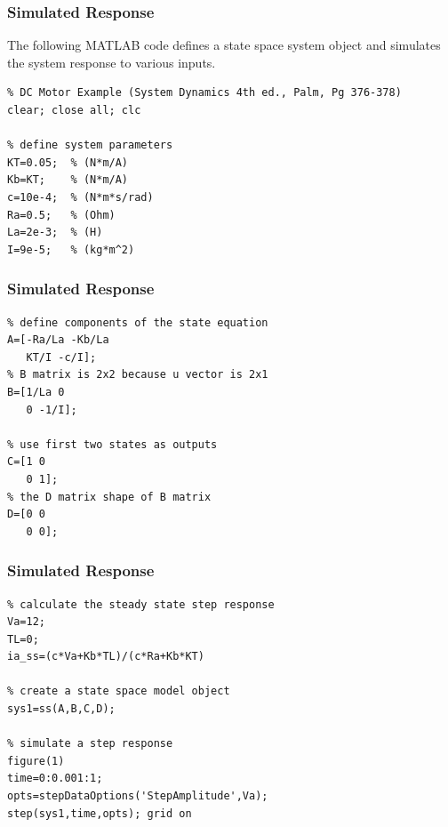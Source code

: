 \documentclass[fleqn]{beamer}                  %
\newcommand{\sectiontitleV}{Simulated Response}
\begin{document}
	\begin{frame}[containsverbatim,label=sectionV] \small
		\frametitle{\sectiontitleV}

		The following MATLAB code defines a state space system object and simulates the system response to various inputs.
		
		\begin{lstlisting}
% DC Motor Example (System Dynamics 4th ed., Palm, Pg 376-378)  
clear; close all; clc

% define system parameters
KT=0.05;  % (N*m/A)
Kb=KT;    % (N*m/A)
c=10e-4;  % (N*m*s/rad)   
Ra=0.5;   % (Ohm)
La=2e-3;  % (H)
I=9e-5;   % (kg*m^2)
		\end{lstlisting}
\end{frame}	

	\begin{frame}[containsverbatim,label=sectionV] \small
		\frametitle{\sectiontitleV}
		\begin{lstlisting}
% define components of the state equation
A=[-Ra/La -Kb/La
   KT/I -c/I];
% B matrix is 2x2 because u vector is 2x1
B=[1/La 0 
   0 -1/I];

% use first two states as outputs
C=[1 0
   0 1];
% the D matrix shape of B matrix 
D=[0 0
   0 0];
		\end{lstlisting}
	\end{frame}

	\begin{frame}[containsverbatim,label=sectionV] \small
		\frametitle{\sectiontitleV}
		\begin{lstlisting}
% calculate the steady state step response
Va=12;
TL=0;
ia_ss=(c*Va+Kb*TL)/(c*Ra+Kb*KT)

% create a state space model object
sys1=ss(A,B,C,D);

% simulate a step response 
figure(1)
time=0:0.001:1;
opts=stepDataOptions('StepAmplitude',Va);
step(sys1,time,opts); grid on
		\end{lstlisting}

	\end{frame}	
\end{document}
